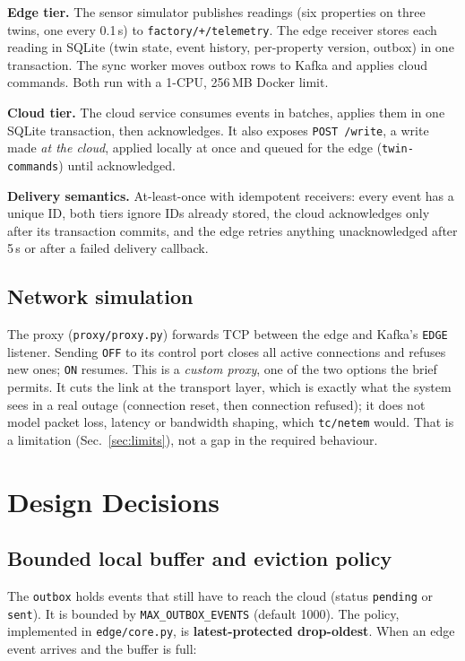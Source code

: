 \documentclass[11pt,a4paper]{article}
\begin{document}
\textbf{Edge tier.} The sensor simulator publishes readings (six properties on three twins, one every 0.1\,s) to
\texttt{factory/+/telemetry}. The edge receiver stores each reading in SQLite (twin state, event history,
per-property version, outbox) in one transaction. The sync worker moves outbox rows to Kafka and
applies cloud commands. Both run with a 1-CPU, 256\,MB Docker limit.

\textbf{Cloud tier.} The cloud service consumes events in batches, applies them in one SQLite
transaction, then acknowledges. It also exposes \texttt{POST /write}, a write made \emph{at the cloud},
applied locally at once and queued for the edge (\texttt{twin-commands}) until acknowledged.

\textbf{Delivery semantics.} At-least-once with idempotent receivers: every event has a unique ID,
both tiers ignore IDs already stored, the cloud acknowledges only after its transaction commits, and
the edge retries anything unacknowledged after 5\,s or after a failed delivery callback.

\subsection{Network simulation}\label{sec:proxy}
The proxy (\texttt{proxy/proxy.py}) forwards TCP between the edge and Kafka's \texttt{EDGE} listener. Sending
\texttt{OFF} to its control port closes all active connections and refuses new ones; \texttt{ON} resumes.
This is a \emph{custom proxy}, one of the two options the brief permits. It cuts the link at the transport
layer, which is exactly what the system sees in a real outage (connection reset, then connection refused);
it does not model packet loss, latency or bandwidth shaping, which \texttt{tc/netem} would. That is a
limitation (Sec.~\ref{sec:limits}), not a gap in the required behaviour.

\section{Design Decisions}
\subsection{Bounded local buffer and eviction policy}\label{sec:buffer}
The \texttt{outbox} holds events that still have to reach the cloud (status \texttt{pending} or
\texttt{sent}). It is bounded by \texttt{MAX\_OUTBOX\_EVENTS} (default 1000). The policy, implemented in
\texttt{edge/core.py}, is \textbf{latest-protected drop-oldest}. When an edge event arrives and the
buffer is full:
\end{document}
